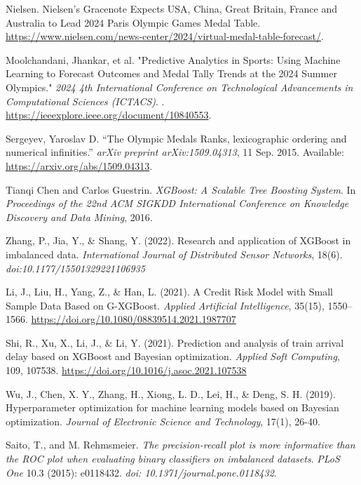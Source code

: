 \documentclass[12pt]{article}  %
\begin{document}
\begin{thebibliography}{99}
Nielsen.
\newblock Nielsen’s Gracenote Expects USA, China, Great Britain, France and Australia to Lead 2024 Paris Olympic Games Medal Table.
\newblock \url{https://www.nielsen.com/news-center/2024/virtual-medal-table-forecast/}.

Moolchandani, Jhankar, et al.
\newblock "Predictive Analytics in Sports: Using Machine Learning to Forecast Outcomes and Medal Tally Trends at the 2024 Summer Olympics."
\newblock \textit{2024 4th International Conference on Technological Advancements in Computational Sciences (ICTACS)}.
.
\newblock \url{https://ieeexplore.ieee.org/document/10840553}.

Sergeyev, Yaroslav D.
\newblock \textquotedblleft The Olympic Medals Ranks, lexicographic ordering and numerical infinities.\textquotedblright
\newblock \textit{arXiv preprint arXiv:1509.04313}, 11 Sep. 2015.
\newblock Available: \url{https://arxiv.org/abs/1509.04313}.

Tianqi Chen and Carlos Guestrin.
\textit{XGBoost: A Scalable Tree Boosting System}.
In \textit{Proceedings of the 22nd ACM SIGKDD International Conference on Knowledge Discovery and Data Mining}, 2016.

Zhang, P., Jia, Y., \& Shang, Y. (2022). Research and application of XGBoost in imbalanced data. \textit{International Journal of Distributed Sensor Networks}, 18(6). \textit{doi:10.1177/15501329221106935}

Li, J., Liu, H., Yang, Z., \& Han, L. (2021). A Credit Risk Model with Small Sample Data Based on G-XGBoost. \textit{Applied Artificial Intelligence}, 35(15), 1550--1566. \url{https://doi.org/10.1080/08839514.2021.1987707}

Shi, R., Xu, X., Li, J., \& Li, Y. (2021). Prediction and analysis of train arrival delay based on XGBoost and Bayesian optimization. \textit{Applied Soft Computing}, 109, 107538. \url{https://doi.org/10.1016/j.asoc.2021.107538}

Wu, J., Chen, X. Y., Zhang, H., Xiong, L. D., Lei, H., \& Deng, S. H. (2019). Hyperparameter optimization for machine learning models based on Bayesian optimization. \textit{Journal of Electronic Science and Technology}, 17(1), 26-40.

Saito, T., and M. Rehmsmeier.
\textit{The precision-recall plot is more informative than the ROC plot when evaluating binary classifiers on imbalanced datasets}.
\textit{PLoS One} 10.3 (2015): e0118432.
\textit{doi: 10.1371/journal.pone.0118432}.


\end{thebibliography}
\end{document}
